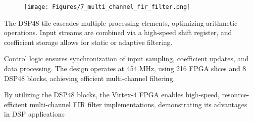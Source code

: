 \documentclass{article}
\begin{document}
	\begin{figure}
		\centering
		\texttt{[image: Figures/7\_multi\_channel\_fir\_filter.png]}
		\label{fig:enter-label}
	\end{figure}
	
	The DSP48 tile cascades multiple processing elements, optimizing arithmetic operations. Input streams are combined via a high-speed shift register, and coefficient storage allows for static or adaptive filtering.
	
	Control logic ensures synchronization of input sampling, coefficient updates, and data processing. The design operates at 454 MHz, using 216 FPGA slices and 8 DSP48 blocks, achieving efficient multi-channel filtering.
	
	By utilizing the DSP48 blocks, the Virtex-4 FPGA enables high-speed, resource-efficient multi-channel FIR filter implementations, demonstrating its advantages in DSP applications
	
\end{document}
